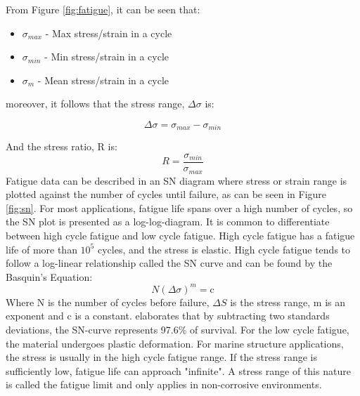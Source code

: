 From Figure \ref{fig:fatigue}, it can be seen that:
\begin{itemize}
    \item $\sigma_{max}$ -  Max stress/strain in a cycle
    \item $\sigma_{min}$ -  Min stress/strain in a cycle
    \item $\sigma_{m}$ - Mean stress/strain in a cycle
\end{itemize}

moreover, it follows that the stress range, $\Delta \sigma$ is:

\begin{equation}
    \Delta \sigma =\sigma_{max} - \sigma_{min}
\end{equation}

\noindent And the stress ratio, R is:
\begin{equation}
    R=\frac{\sigma_{min}}{\sigma_{max}}
\end{equation}
Fatigue data can be described in an SN diagram where stress or strain range is plotted against the number of cycles until failure, as can be seen in Figure \ref{fig:sn}. For most applications, fatigue life spans over a high number of cycles, so the SN plot is presented as a log-log-diagram. It is common to differentiate between high cycle fatigue and low cycle fatigue. High cycle fatigue has a fatigue life of more than $10^5$ cycles, and the stress is elastic. High cycle fatigue tends to follow a log-linear relationship called the SN curve and can be found by the Basquin’s Equation:
\begin{equation}
    N(\Delta \sigma)^m = \text{c}
    \label{eq:sn}
\end{equation}
\noindernt Where N is the number of cycles before failure, $\Delta S$ is the stress range, m is an exponent and c is a constant. \cite{dnvfatigue} elaborates that by subtracting two standards deviations, the SN-curve represents 97.6\% of survival. \newline
\newline
For the low cycle fatigue, the material undergoes plastic deformation. For marine structure applications, the stress is usually in the high cycle fatigue range. If the stress range is sufficiently low, fatigue life can approach "infinite". A stress range of this nature is called the fatigue limit and only applies in non-corrosive environments. 


